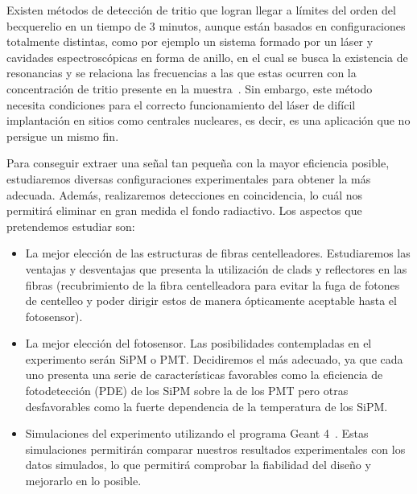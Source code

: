 Existen métodos de detección de tritio que logran llegar a límites del orden del becquerelio en un tiempo de 3 minutos, aunque  están basados en configuraciones totalmente distintas, como por ejemplo un sistema formado por un láser y cavidades espectroscópicas en forma de anillo, en el cual se  busca la existencia de resonancias y  se relaciona las frecuencias a las que estas ocurren con la concentración de tritio presente en la muestra~\cite{Anillo}. Sin embargo, este método necesita  condiciones  para el correcto funcionamiento del láser de difícil implantación  en sitios como centrales nucleares, es decir, es una aplicación que no persigue un mismo fin. 

Para conseguir extraer una señal tan pequeña con la mayor eficiencia posible,  estudiaremos diversas configuraciones experimentales para obtener la más adecuada. Además, realizaremos detecciones en coincidencia, lo cuál nos permitirá eliminar en gran medida el fondo radiactivo. Los aspectos que pretendemos estudiar son: 
\begin{itemize}
\item {}
La mejor elección de las estructuras de fibras centelleadores. Estudiaremos las ventajas y desventajas que presenta la utilización de clads  y reflectores en las fibras (recubrimiento de la fibra centelleadora para evitar la fuga de fotones de centelleo y poder dirigir estos de manera ópticamente aceptable hasta el fotosensor). 
\item {}
La mejor elección del fotosensor. Las posibilidades contempladas en el experimento serán SiPM o PMT. Decidiremos el más adecuado, ya que cada uno presenta una serie de características favorables como la eficiencia de fotodetección (PDE) de los SiPM sobre la de los PMT pero otras desfavorables como la  fuerte dependencia de  la temperatura de  los SiPM.

\item {} Simulaciones del experimento  utilizando el programa Geant 4~\cite{Geant4a, Geant4b, Geant4c}. Estas simulaciones permitirán comparar nuestros resultados experimentales con los datos simulados, lo que permitirá comprobar la fiabilidad del diseño y mejorarlo en lo posible. 

\end{itemize}


